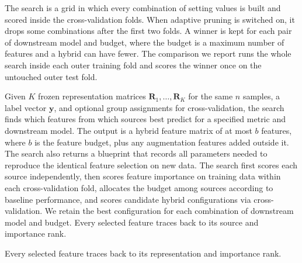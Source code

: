 The search is a grid in which every combination of setting values is built and scored inside the cross-validation folds. When adaptive pruning is switched on, it drops some combinations after the first two folds. A winner is kept for each pair of downstream model and budget, where the budget is a maximum number of features and a hybrid can have fewer. The comparison we report runs the whole search inside each outer training fold and scores the winner once on the untouched outer test fold.

Given $K$ frozen representation matrices $\mathbf{R}_1, \dots, \mathbf{R}_K$ for the same $n$ samples, a label vector $\mathbf{y}$, and optional group assignments for cross-validation, the search finds which features from which sources best predict for a specified metric and downstream model. The output is a hybrid feature matrix of at most $b$ features, where $b$ is the feature budget, plus any augmentation features added outside it. The search also returns a blueprint that records all parameters needed to reproduce the identical feature selection on new data. The search first scores each source independently, then scores feature importance on training data within each cross-validation fold, allocates the budget among sources according to baseline performance, and scores candidate hybrid configurations via cross-validation. We retain the best configuration for each combination of downstream model and budget. Every selected feature traces back to its source and importance rank.

Every selected feature traces back to its representation and importance rank.


